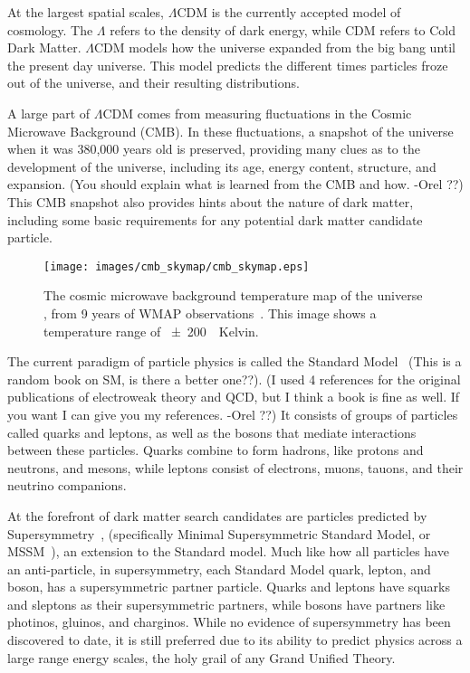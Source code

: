   At the largest spatial scales, $\Lambda$CDM is the currently accepted model of cosmology.
  The $\Lambda$ refers to the density of dark energy, while CDM refers to Cold Dark Matter.
  $\Lambda$CDM models how the universe expanded from the big bang until the present day universe.
  This model predicts the different times particles froze out of the universe, and their resulting distributions.

  A large part of $\Lambda$CDM comes from measuring fluctuations in the Cosmic Microwave Background (CMB).
  In these fluctuations, a snapshot of the universe when it was 380,000 years old is preserved, providing many clues as to the development of the universe, including its age, energy content, structure, and expansion. 
  {\color{red}(You should explain what is learned from the CMB and how. -Orel ??)}
  This CMB snapshot also provides hints about the nature of dark matter, including some basic requirements for any potential dark matter candidate particle.

  \begin{figure}[ht]
    \texttt{[image: images/cmb\_skymap/cmb\_skymap.eps]}
    \caption[The Cosmic Microwave Background]{
      The cosmic microwave background temperature map of the universe \cite{wmap_skymap}, from 9 years of WMAP observations~\cite{wmap9year}.
      This image shows a temperature range of \SI{\pm200}{\mu{}Kelvin}.
    }
    \label{fig:cmb}
  \end{figure}

  The current paradigm of particle physics is called the Standard Model~\cite{standardmodel} {\color{red}(This is a random book on SM, is there a better one??)}.
  {\color{red}(I used 4 references for the original publications of electroweak theory and QCD, but I think a book is fine as well. If you want I can give you my references. -Orel ??)}
  It consists of groups of particles called quarks and leptons, as well as the bosons that mediate interactions between these particles.
  Quarks combine to form hadrons, like protons and neutrons, and mesons, while leptons consist of electrons, muons, tauons, and their neutrino companions.

  At the forefront of dark matter search candidates are particles predicted by Supersymmetry~\cite{Jungman:1995df}, (specifically Minimal Supersymmetric Standard Model, or MSSM~\cite{MSSM}), an extension to the Standard model.
  Much like how all particles have an anti-particle, in supersymmetry, each Standard Model quark, lepton, and boson, has a supersymmetric partner particle.
  Quarks and leptons have squarks and sleptons as their supersymmetric partners, while bosons have partners like photinos, gluinos, and charginos.
  While no evidence of supersymmetry has been discovered to date, it is still preferred due to its ability to predict physics across a large range energy scales, the holy grail of any Grand Unified Theory.
  

